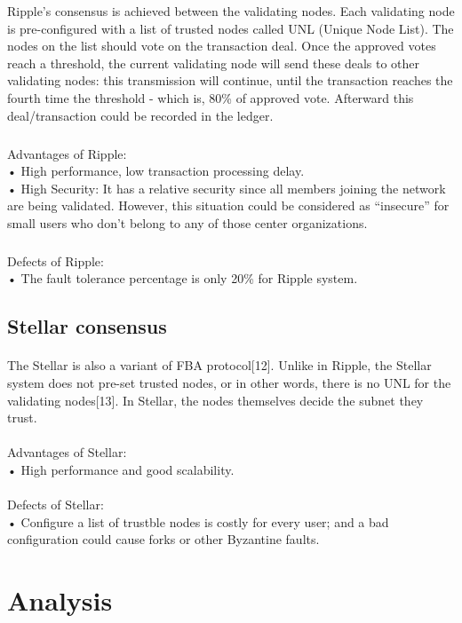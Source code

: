 \documentclass[doublespacing]{bmcart}
\begin{document}
\begin{CJK*}{UTF8}{gbsn}
Ripple's consensus is achieved between the validating nodes. Each validating node is pre-configured with a list of trusted nodes called UNL (Unique Node List). The nodes on the list should vote on the transaction deal. Once the approved votes reach a threshold, the current validating node will send these deals to other validating nodes: this transmission will continue, until the transaction reaches the fourth time the threshold - which is, 80\% of approved vote. Afterward this deal/transaction could be recorded in the ledger.
	
	\subparagraph{} 
Advantages of Ripple:
\\• High performance, low transaction processing delay.
\\• High Security: It has a relative security since all members joining the network are being validated. However, this situation could be considered as ``insecure'' for small users who don't belong to any of those center organizations.
	\subparagraph{} 
Defects of Ripple:	
\\• The fault tolerance percentage is only 20\% for Ripple system.

	
	\subsection{Stellar consensus}
	\paragraph{} 
	The Stellar is also a variant of FBA protocol[12]. Unlike in Ripple, the Stellar system does not pre-set trusted nodes, or in other words, there is no UNL for the validating nodes[13]. In Stellar, the nodes themselves decide the subnet they trust. 
	\paragraph{} 
Advantages of Stellar:
\\• High performance and good scalability.
	\paragraph{} 
Defects of Stellar:	
\\• Configure a list of trustble nodes is costly for every user; and a bad configuration could cause forks or other Byzantine faults.

\section{Analysis}


\end{CJK*}
\end{document}
